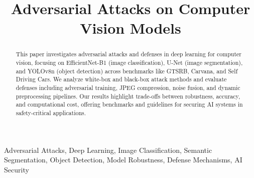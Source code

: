 \documentclass[conference]{IEEEtran}
\begin{document}
\title{Adversarial Attacks on Computer Vision Models}

\maketitle

\begin{abstract}
This paper investigates adversarial attacks and defenses in deep learning for computer vision, focusing on EfficientNet-B1 (image classification), U-Net (image segmentation), and YOLOv8n (object detection) across benchmarks like GTSRB, Carvana, and Self Driving Cars. We analyze white-box and black-box attack methods and evaluate defenses including adversarial training, JPEG compression, noise fusion, and dynamic preprocessing pipelines. Our results highlight trade-offs between robustness, accuracy, and computational cost, offering benchmarks and guidelines for securing AI systems in safety-critical applications.
\end{abstract}

\begin{IEEEkeywords}
Adversarial Attacks, Deep Learning, Image Classification, Semantic Segmentation, Object Detection, Model Robustness, Defense Mechanisms, AI Security
\end{IEEEkeywords}
\end{document}
